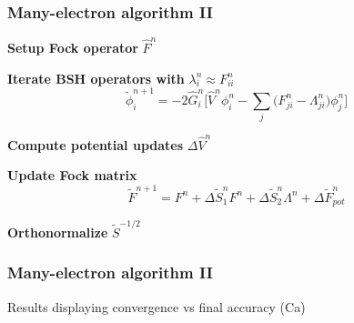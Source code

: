 \documentclass[mathserif, 10pt]{beamer}
\begin{document}
\begin{frame}
    \frametitle{Many-electron algorithm II}
    \centering
    \textbf{Setup Fock operator} $\hat{F}^n$

    \vspace{8mm}

    \textbf{Iterate BSH operators with} $\lambda_i^n \approx F_{ii}^n$
    \begin{equation}
	\nonumber
        \tilde{\phi}_i^{n+1} = -2\hat{G}_i^n \bigg[\hat{V}^n\phi_i^n -
        \sum_j\big(F_{ji}^n - \Lambda_{ji}^n\big)\phi_j^n\bigg]
    \end{equation}

    \vspace{2mm}

    \textbf{Compute potential updates} $\Delta\hat{V}^n$

    \vspace{8mm}

    \textbf{Update Fock matrix}
    \begin{equation}
        \nonumber
        \tilde{F}^{n+1} = F^{n} + 
        \Delta \tilde{S}_1^n F^n +
        \Delta \tilde{S}_2^n \Lambda^n +
        \Delta \tilde{F}_{pot}^n
    \end{equation}

    \vspace{5mm}

    \textbf{Orthonormalize} $\tilde{S}^{-1/2}$

\end{frame}

\begin{frame}
    \frametitle{Many-electron algorithm II}
    Results displaying convergence vs final accuracy (Ca)
\end{frame}
\end{document}
